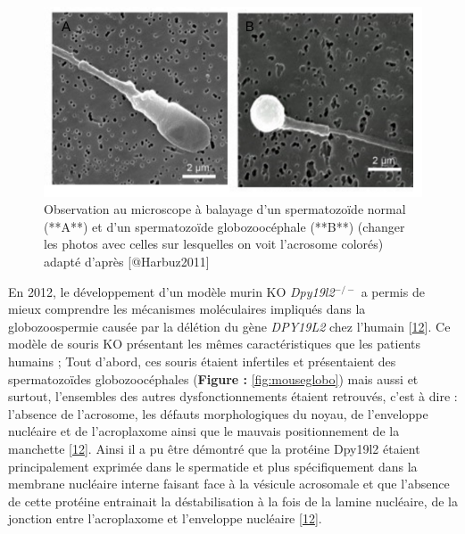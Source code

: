 \documentclass[12pt,twoside]{reedthesis}
\begin{document}
  \begin{figure}
  
  {\centering \includegraphics[scale=0.50]{figure/globo_normal_spz} 
  
  }
  
  \caption[Observation au microscope à balayage d'un spermatozoïde normal (**A**) et d'un spermatozoïde globozoocéphale (**B**) (changer les photos avec celles sur lesquelles on voit l'acrosome colorés)]{Observation au microscope à balayage d'un spermatozoïde normal (**A**) et d'un spermatozoïde globozoocéphale (**B**) (changer les photos avec celles sur lesquelles on voit l'acrosome colorés) adapté d'après [@Harbuz2011]}\label{fig:globospz}
  \end{figure}
  
  En 2012, le développement d'un modèle murin KO \emph{Dpy19l2}\(^{-/-}\)
  a permis de mieux comprendre les mécanismes moléculaires impliqués dans
  la globozoospermie causée par la délétion du gène \emph{DPY19L2} chez
  l'humain {[}\protect\hyperlink{ref-Pierre2012}{12}{]}. Ce modèle de
  souris KO présentant les mêmes caractéristiques que les patients humains
  ; Tout d'abord, ces souris étaient infertiles et présentaient des
  spermatozoïdes globozoocéphales (\textbf{Figure : }\ref{fig:mouseglobo})
  mais aussi et surtout, l'ensembles des autres dysfonctionnements étaient
  retrouvés, c'est à dire : l'absence de l'acrosome, les défauts
  morphologiques du noyau, de l'enveloppe nucléaire et de l'acroplaxome
  ainsi que le mauvais positionnement de la manchette
  {[}\protect\hyperlink{ref-Pierre2012}{12}{]}. Ainsi il a pu être
  démontré que la protéine Dpy19l2 étaient principalement exprimée dans le
  spermatide et plus spécifiquement dans la membrane nucléaire interne
  faisant face à la vésicule acrosomale et que l'absence de cette protéine
  entrainait la déstabilisation à la fois de la lamine nucléaire, de la
  jonction entre l'acroplaxome et l'enveloppe nucléaire
  {[}\protect\hyperlink{ref-Pierre2012}{12}{]}.
  
\end{document}
